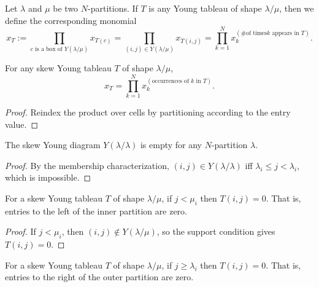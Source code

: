 \begin{definition}
\label{def.sf.ytab.skew-xT}
\leantarget
\leanok
Let $\lambda$ and $\mu$ be two $N$-partitions. If
$T$ is any Young tableau of shape $\lambda/\mu$, then we define the
corresponding monomial%
\[
x_{T}:=\prod_{c\text{ is a box of }Y\left(  \lambda/\mu\right)  }x_{T\left(
c\right)  }=\prod_{\left(  i,j\right)  \in Y\left(  \lambda/\mu\right)
}x_{T\left(  i,j\right)  }=\prod_{k=1}^{N}x_{k}^{\left(  \text{\# of times
}k\text{ appears in }T\right)  }.
\]
\end{definition}

\begin{lemma}
\label{lem.sf.skew-tab-monomial-prod-pow}
\leanhelper
\leanok
For any skew Young tableau $T$ of shape $\lambda/\mu$,
\[
  x_T = \prod_{k=1}^{N} x_k^{(\text{occurrences of } k \text{ in } T)}.
\]
\end{lemma}

\begin{proof}
\leanok
Reindex the product over cells by partitioning according to the entry value.
\end{proof}

\begin{lemma}
\label{lem.sf.skew-diag-self}
\leanhelper
\leanok
The skew Young diagram $Y(\lambda/\lambda)$ is empty for any $N$-partition $\lambda$.
\end{lemma}

\begin{proof}
\leanok
By the membership characterization, $(i,j) \in Y(\lambda/\lambda)$ iff
$\lambda_i \le j < \lambda_i$, which is impossible.
\end{proof}

\begin{lemma}
\label{lem.sf.skew-tab-entry-lt-mu}
\leanhelper
\leanok
For a skew Young tableau $T$ of shape $\lambda/\mu$, if $j < \mu_i$ then $T(i,j) = 0$.
That is, entries to the left of the inner partition are zero.
\end{lemma}

\begin{proof}
\leanok
If $j < \mu_i$, then $(i,j) \notin Y(\lambda/\mu)$, so the support condition gives $T(i,j) = 0$.
\end{proof}

\begin{lemma}
\label{lem.sf.skew-tab-entry-ge-lam}
\leanhelper
\leanok
For a skew Young tableau $T$ of shape $\lambda/\mu$, if $j \ge \lambda_i$ then $T(i,j) = 0$.
That is, entries to the right of the outer partition are zero.
\end{lemma}

